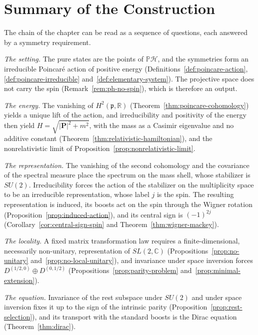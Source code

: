	\section{Summary of the Construction}
	\label{sec:dirac-summary}
	
	The chain of the chapter can be read as a sequence of questions, each answered by a symmetry requirement.
	
	\begin{remark}\label{rem:dirac-used}
		\emph{The setting.} The pure states are the points of $\mathbb{P}\mathcal{H}$, and the symmetries form an irreducible Poincar\'e action of positive energy (Definitions~\ref{def:poincare-action}, \ref{def:poincare-irreducible} and~\ref{def:elementary-system}). The projective space does not carry the spin (Remark~\ref{rem:ph-no-spin}), which is therefore an output.
		
		\emph{The energy.} The vanishing of $H^2(\mathfrak{p},\mathbb{R})$ (Theorem~\ref{thm:poincare-cohomology}) yields a unique lift of the action, and irreducibility and positivity of the energy then yield $H=\sqrt{|\mathbf{P}|^2+m^2}$, with the mass as a Casimir eigenvalue and no additive constant (Theorem~\ref{thm:relativistic-hamiltonian}), and the nonrelativistic limit of Proposition~\ref{prop:nonrelativistic-limit}.
		
		\emph{The representation.} The vanishing of the second cohomology and the covariance of the spectral measure place the spectrum on the mass shell, whose stabilizer is $SU(2)$. Irreducibility forces the action of the stabilizer on the multiplicity space to be an irreducible representation, whose label $j$ is the spin. The resulting representation is induced, its boosts act on the spin through the Wigner rotation (Proposition~\ref{prop:induced-action}), and its central sign is $(-1)^{2j}$ (Corollary~\ref{cor:central-sign-spin} and Theorem~\ref{thm:wigner-mackey}).
		
		\emph{The locality.} A fixed matrix transformation law requires a finite-dimensional, necessarily non-unitary, representation of $SL(2,\mathbb{C})$ (Propositions~\ref{prop:no-unitary} and~\ref{prop:no-local-unitary}), and invariance under space inversion forces $D^{(1/2,0)}\oplus D^{(0,1/2)}$ (Propositions~\ref{prop:parity-problem} and~\ref{prop:minimal-extension}).
		
		\emph{The equation.} Invariance of the rest subspace under $SU(2)$ and under space inversion fixes it up to the sign of the intrinsic parity (Proposition~\ref{prop:rest-selection}), and its transport with the standard boosts is the Dirac equation (Theorem~\ref{thm:dirac}).
		

\end{remark}
